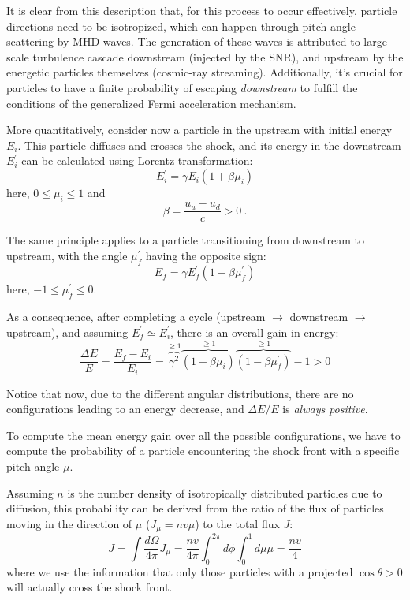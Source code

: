 It is clear from this description that, for this process to occur effectively, particle directions need to be isotropized, which can happen through pitch-angle scattering by MHD waves. The generation of these waves is attributed to large-scale turbulence cascade downstream (injected by the SNR), and upstream by the energetic particles themselves (cosmic-ray streaming).
%
Additionally, it's crucial for particles to have a finite probability of escaping \emph{downstream} to fulfill the conditions of the generalized Fermi acceleration mechanism.

More quantitatively, consider now a particle in the upstream with initial energy \( E_i \). 
%
This particle diffuses and crosses the shock, and its energy in the downstream \( E_i^\prime \) can be calculated using Lorentz transformation:
%
\begin{equation}
E_i^\prime = \gamma E_i \left( 1 + \beta \mu_i \right)
\end{equation}
%
here, \( 0 \le \mu_i \le 1 \) and
%
\begin{equation}
\beta = \frac{u_u - u_d}{c} > 0~.
\end{equation}

The same principle applies to a particle transitioning from downstream to upstream, with the angle \( \mu_f^\prime \) having the opposite sign:
%
\begin{equation}
E_f = \gamma E^\prime_f (1 - \beta \mu_f^\prime)
\end{equation}
here, \( -1 \le \mu_f^\prime \le 0 \).

As a consequence, after completing a cycle (upstream $\rightarrow$ downstream $\rightarrow$ upstream), and assuming \( E^\prime_f \simeq E^\prime_i \), there is an overall gain in energy:
%
\begin{equation}
\frac{\Delta E}{E} = \frac{E_f - E_i}{E_i} = \overbrace{\gamma^2}^{\ge 1} \overbrace{(1 + \beta \mu_i)}^{\ge 1} \overbrace{(1 - \beta \mu_f^\prime)}^{\ge 1} - 1 > 0
\end{equation}

Notice that now, due to the different angular distributions, there are no configurations leading to an energy decrease, and \( \Delta E / E \) is \emph{always positive}.

To compute the mean energy gain over all the possible configurations, we have to compute the probability of a particle encountering the shock front with a specific pitch angle \( \mu \). 

Assuming \( n \) is the number density of isotropically distributed particles due to diffusion, this probability can be derived from the ratio of the flux of particles moving in the direction of \( \mu \) (\( J_\mu = n v \mu \)) to the total flux \( J \):
%
\begin{equation}
J = \int \frac{d\Omega}{4\pi} J_\mu = \frac{n v}{4\pi} \int_0^{2\pi} d\phi \int_0^1 d\mu \mu = \frac{n v}{4}
\end{equation}
%
where we use the information that only those particles with a projected \( \cos \theta > 0 \) will actually cross the shock front.

